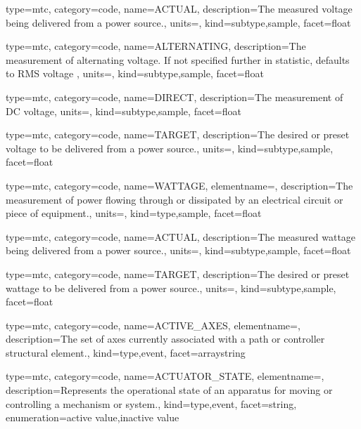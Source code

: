 {
  type=mtc,
  category=code,
  name={ACTUAL},
  description={The measured voltage being delivered from a power source.},
  units=,
  kind={subtype,sample},
  facet={\gls{float}}
}


{
  type=mtc,
  category=code,
  name={ALTERNATING},
  description={The measurement of alternating voltage.   If not specified further in statistic, defaults to RMS voltage  },
  units=,
  kind={subtype,sample},
  facet={\gls{float}}
}


{
  type=mtc,
  category=code,
  name={DIRECT},
  description={The measurement of DC voltage},
  units=,
  kind={subtype,sample},
  facet={\gls{float}}
}


{
  type=mtc,
  category=code,
  name={TARGET},
  description={The desired or preset voltage to be delivered from a power source.},
  units=,
  kind={subtype,sample},
  facet={\gls{float}}
}


{
  type=mtc,
  category=code,
  name={WATTAGE},
  elementname=,
  description={The measurement of power flowing through or dissipated by an electrical circuit or piece of equipment.},
  units=,
  kind={type,sample},
  facet={\gls{float}}
}


{
  type=mtc,
  category=code,
  name={ACTUAL},
  description={The measured wattage being delivered from a power source.},
  units=,
  kind={subtype,sample},
  facet={\gls{float}}
}


{
  type=mtc,
  category=code,
  name={TARGET},
  description={The desired or preset wattage to be delivered from a power source.},
  units=,
  kind={subtype,sample},
  facet={\gls{float}}
}


{
  type=mtc,
  category=code,
  name={ACTIVE\_AXES},
  elementname=,
  description={The set of axes currently associated with a \gls{path} or \gls{controller} \gls{structural element}.},
  kind={type,event},
  facet={\gls{arraystring}}
}


{
  type=mtc,
  category=code,
  name={ACTUATOR\_STATE},
  elementname=,
  description={Represents the operational state of an apparatus for moving or controlling a mechanism or system.},
  kind={type,event},
  facet={\gls{string}},
  enumeration={\gls{active value},\gls{inactive value}}
}


